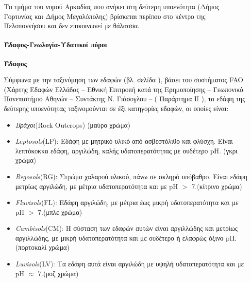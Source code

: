 \documentclass[12pt]{article}
\begin{document}
	Το τμήμα του νομού Αρκαδίας που ανήκει στη δεύτερη υποενότητα (Δήμος Γορτυνίας και Δήμος Μεγαλόπολης) βρίσκεται περίπου στο κέντρο της Πελοποννήσου και δεν επικοινωνεί με θάλασσα.
	
	\paragraph{Έδαφος-Γεωλογία-Υδατικοί πόροι}
	
	\textbf{Έδαφος}
	
	Σύμφωνα με την ταξινόμηση των εδαφών (βλ. σελίδα \pageref{edafi}), βάσει του συστήματος FAO (Χάρτης Εδαφών Ελλάδας – Εθνική Επιτροπή κατά της Ερημοποίησης – Γεωπονικό Πανεπιστήμιο Αθηνών – Συντάκτης Ν. Γιάσογλου – ( Παράρτημα IΙ ), τα εδάφη της δεύτερης υποενότητας ταξινομούνται σε έξι κατηγορίες εδαφών, οι οποίες είναι:
	
	\begin{itemize}
		\item \emph{Βράχοι}(Rock Outcrops) (μαύρο χρώμα)
		\item \emph{Leptosols}(LP): Εδάφη με μητρικό υλικό από ασβεστόλιθο και φλύσχη. Είναι λεπτόκοκκα εδάφη, αργιλώδη, καλής υδατοπερατότητας με ουδέτερο pH. (γκρι χρώμα)
		\item \emph{Regosols}(RG): Στρώμα χαλαρού υλικού, πάνω σε σκληρό υπόβαθρο. Είναι εδάφη μετρίως αργιλώδη, με μέτρια υδατοπερατότητα και με pH $>$ 7.(κίτρινο χρώμα)
		\item \emph{Fluvisols}(FL): Εδάφη αργιλώδη, με μέτρια έως μικρή υδατοπερατότητα και με pH $>$ 7.(μπλε χρώμα)
		\item \emph{Cambisols}(CM): Η σύσταση των εδαφών αυτών είναι αργιλλώδης και μετρίως αργιλλώδης, με μικρή υδατοπερατότητα και με ουδέτερο ή ελαφρώς όξινο pH. (πορτοκαλί χρώμα)
		\item \emph{Luvisols}(LV): Τα εδάφη αυτά είναι αργιλώδη με υψηλή υδατοπερατότητα και με pH $\approx$ 7.(ροζ χρώμα)
	\end{itemize}
\end{document}
